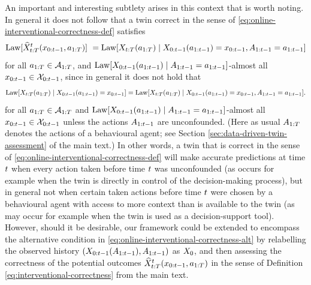 An important and interesting subtlety arises in this context that is worth noting.
In general it does not follow that a twin correct in the sense of \eqref{eq:online-interventional-correctness-def} satisfies
\begin{equation}
    \mathrm{Law}[\widehat{X}_{t:T}^t(x_{0:t-1}, a_{1:T})] \
        = \mathrm{Law}[X_{t:T}(a_{1:T}) \mid X_{0:t-1}(a_{1:t-1}) = x_{0:t-1}, A_{1:t-1} = a_{1:t-1}] \label{eq:online-interventional-correctness-alt}
\end{equation}
for all $a_{1:T} \in \mathcal{A}_{1:T}$, and $\mathrm{Law}[X_{0:t-1}(a_{1:t-1}) \mid A_{1:t-1} = a_{1:t-1}]$-almost all $x_{0:t-1} \in \mathcal{X}_{0:t-1}$, 
since in general it does not hold that 
\begin{multline*}
    \mathrm{Law}[X_{t:T}(a_{1:T}) \mid X_{0:t-1}(a_{1:t-1}) = x_{0:t-1}]
        = \mathrm{Law}[X_{t:T}(a_{1:T}) \mid X_{0:t-1}(a_{1:t-1}) = x_{0:t-1}, A_{1:t-1} = a_{1:t-1}].
\end{multline*}
for all $a_{1:T} \in \mathcal{A}_{1:T}$ and $\mathrm{Law}[X_{0:t-1}(a_{1:t-1}) \mid A_{1:t-1} = a_{1:t-1}]$-almost all $x_{0:t-1} \in \mathcal{X}_{0:t-1}$ unless the actions $A_{1:t-1}$ are unconfounded.
(Here as usual $A_{1:T}$ denotes the actions of a behavioural agent; see Section \ref{sec:data-driven-twin-assessment} of the main text.)
In other words, a twin that is correct in the sense of \eqref{eq:online-interventional-correctness-def} will make accurate predictions at time $t$ when every action taken before time $t$ was unconfounded (as occurs for example when the twin is directly in control of the decision-making process), but in general not when certain taken actions before time $t$ were chosen by a behavioural agent with access to more context than is available to the twin (as may occur for example when the twin is used as a decision-support tool).
However, should it be desirable, our framework could be extended to encompass the alternative condition in \eqref{eq:online-interventional-correctness-alt} by relabelling the observed history $(X_{0:t-1}(A_{1:t-1}), A_{1:t-1})$ as $X_0$, and then assessing the correctness of the potential outcomes $\widehat{X}_{t:T}^t(x_{0:t-1}, a_{1:T})$ in the sense of Definition \ref{eq:interventional-correctness} from the main text.


